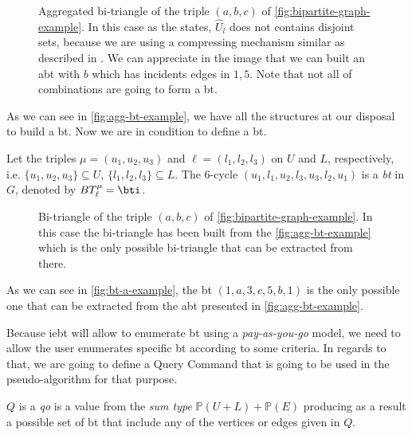 \begin{figure}[h!]
\centering      
{}
\caption[{[\acrshort{iebt}] Example Aggregated bi-triangle}]{Aggregated bi-triangle of the triple $(a,b,c)$ of \autoref{fig:bipartite-graph-example}. In this case as the  states, $\hat{U}_l$ does not contains disjoint sets, because we are using a compressing mechanism similar as described in \cite{Lai}. We can appreciate in the image that we can built an \acrshort{abt} with $b$ which has incidents edges in $1,5$. Note that not all of combinations are going to form a \acrshort{bt}.}
\label{fig:agg-bt-example}
\end{figure}
      
As we can see in \autoref{fig:agg-bt-example}, we have all the structures at our disposal to build a \acrshort{bt}. Now we are in condition to define a \acrshort{bt}.

\begin{definition}[\acrlong{bt}]\label{def:bt}
Let the triples $\mu=(u_1, u_2, u_3)$ and $\ell=(l_1, l_2,l_3)$ on $U$ and $L$, respectively, i.e.  $\{u_1, u_2, u_3\} \subseteq U$, $\{l_1, l_2,l_3\} \subseteq L$. 
The 6-cycle $(u_1,l_1,u_2,l_3,u_3,l_2,u_1)$  is a \textit{\acrfull{bt}} in $G$, denoted by $BT_{\ell}^{\mu} = \bti$. 
\end{definition}      

\begin{figure}[h!]
\centering      
{}
\caption[{[\acrshort{iebt}] Example of bi-triangle}]{Bi-triangle of the triple $(a,b,c)$ of \autoref{fig:bipartite-graph-example}. In this case the bi-triangle has been built from the \autoref{fig:agg-bt-example} which is the only possible bi-triangle that can be extracted from there.}
\label{fig:bt-a-example}
\end{figure}

As we can see in \autoref{fig:bt-a-example}, the \acrshort{bt} $(1,a,3,c,5,b,1)$ is the only possible one that can be extracted from the \acrshort{abt} presented in \autoref{fig:agg-bt-example}.

Because \acrshort{iebt} will allow to enumerate \acrshort{bt} using a \emph{pay-as-you-go} model, we need to allow the user enumerates specific \acrshort{bt} according to some criteria.
In regards to that, we are going to define a Query Command that is going to be used in the pseudo-algorithm for that purpose.

\begin{definition}[\acrfull{qo}]\label{def:query:match} 
$Q$ is a \emph{\acrfull{qo}} is a value from the  \textit{sum type}
$\mathbb{P}(U + L) + \mathbb{P}(E)$ producing as a result a possible set of \acrshort{bt} that include any of the vertices or edges given in $Q$.
\end{definition}

